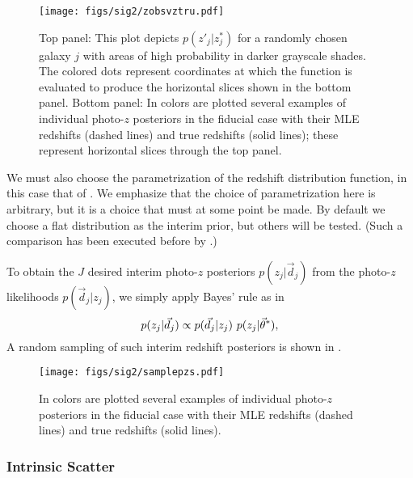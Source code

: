 \begin{figure}
	\texttt{[image: figs/sig2/zobsvztru.pdf]}
	\caption{Top panel: This plot depicts $p(z'_{j}|z^{*}_{j})$ for a randomly chosen galaxy $j$ with areas of high probability in darker grayscale shades.  
		The colored dots represent coordinates at which the function is evaluated to produce the horizontal slices shown in the bottom panel.  
		Bottom panel: In colors are plotted several examples of individual photo-$z$ posteriors in the fiducial case with their MLE redshifts (dashed lines) and true redshifts (solid lines); these represent horizontal slices through the top panel.}
\end{figure}

We must also choose the parametrization of the redshift distribution function, in this case that of .   
We emphasize that the choice of parametrization here is arbitrary, but it is a choice that must at some point be made.  
By default we choose a flat distribution as the interim prior, but others will be tested.  
(Such a comparison has been executed before by \citet{Viironen2015}.)

To obtain the $J$ desired interim photo-$z$ posteriors $p(z_{j}|\vec{d}_{j})$ from the photo-$z$ likelihoods $p(\vec{d}_{j}|z_{j})$, we simply apply Bayes' rule as in 
\begin{equation}
\eqlabel{eq:likpost}
p(z_{j}|\vec{d}_{j}) \propto p(\vec{d}_{j}|z_{j})\ p(z_{j}|\vec{\theta}^{*}),
\end{equation}
A random sampling of such interim redshift posteriors is shown in .  

\begin{figure}
	\texttt{[image: figs/sig2/samplepzs.pdf]}
	\caption{In colors are plotted several examples of individual photo-$z$ posteriors in the fiducial case with their MLE redshifts (dashed lines) and true redshifts (solid lines).}
\end{figure}

\subsubsection{Intrinsic Scatter}

